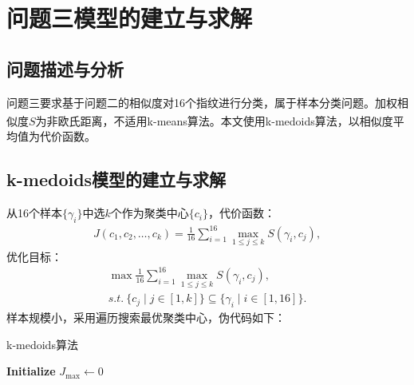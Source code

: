 \documentclass{whutmod}
\newcommand{\upcite}[1]{\textsuperscript{\cite{#1}}}
\begin{document}
    \section{问题三模型的建立与求解}
        \subsection{问题描述与分析}
            问题三要求基于问题二的相似度对16个指纹进行分类，属于样本分类问题。加权相似度$S$为非欧氏距离\upcite{10}，不适用k-means算法。本文使用k-medoids算法，以相似度平均值为代价函数。

        \subsection{k-medoids模型的建立与求解}
            从16个样本$\{\gamma_i\}$中选$k$个作为聚类中心$\{c_i\}$，代价函数：
            \begin{gather}
                J(c_1, c_2, \dots, c_k) = \frac{1}{16} \sum_{i=1}^{16} \max_{1 \leqslant j \leqslant k} S(\gamma_i, c_j),
            \end{gather}
            优化目标：
            \begin{gather}
                \max \frac{1}{16} \sum_{i=1}^{16} \max_{1 \leqslant j \leqslant k} S(\gamma_i, c_j), \\
                s.t. \ \{ c_j \mid j \in [1,k] \} \subseteq \{ \gamma_i \mid i \in [1,16] \}.
            \end{gather}
            样本规模小，采用遍历搜索最优聚类中心，伪代码如下：

            \begin{algorithm}[H]
                \caption{k-medoids算法}
                \LinesNumbered
                \textbf{Initialize} $J_{\max} \leftarrow 0$ \\
            \end{algorithm}
\end{document}
